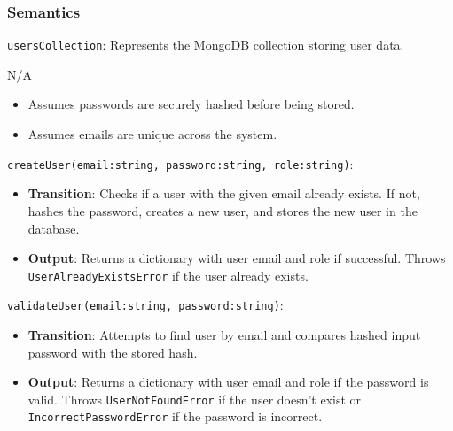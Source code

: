 \documentclass[12pt, titlepage]{article}
\begin{document}
\begin{description}
\subsubsection{Semantics}
\begin{description}
  \item[State Variables:]
  \item
  \texttt{usersCollection}: Represents the MongoDB collection storing user data.
  \item[Environment Variables:]
  \item N/A
  \item[Assumptions:]
  \item
  \begin{itemize}
    \item Assumes passwords are securely hashed before being stored.
  \end{itemize}
  \item
  \begin{itemize}
    \item Assumes emails are unique across the system.
  \end{itemize}

  \item[Access Routine Semantics:] 
  \item
  \texttt{createUser(email:string, password:string, role:string)}:
  \item
  \begin{itemize}
    \item \textbf{Transition}: Checks if a user with the given email already
    exists. If not, hashes the password, creates a new user, and stores the new
    user in the database.
  \end{itemize}
  \item
  \begin{itemize}
    \item \textbf{Output}: Returns a dictionary with user email and role if
    successful. Throws \\
    \texttt{UserAlreadyExistsError} if the user already exists.
  \end{itemize}

  \item
  \texttt{validateUser(email:string, password:string)}:
  \item
  \begin{itemize}
    \item \textbf{Transition}: Attempts to find user by email and compares hashed
    input password with the stored hash.
  \end{itemize}
  \item
  \begin{itemize}
    \item \textbf{Output}: Returns a dictionary with user email and role if the password is valid. Throws \texttt{UserNotFoundError} if the user doesn't exist or \texttt{IncorrectPasswordError} if the password is incorrect.
  \end{itemize}


\end{description}
\end{description}
\end{document}
